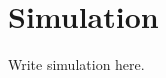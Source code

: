 \documentclass[a4paper,11pt,oneside,openany,fleqn]{jsbook}
\begin{document}
    \chapter{Simulation}
    Write simulation here.
\end{document}
